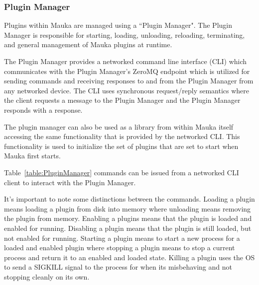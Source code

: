 \subsubsection{Plugin Manager}
Plugins within Mauka are managed using a ``Plugin Manager". The Plugin Manager is responsible for starting, loading, unloading, reloading, terminating, and general management of Mauka plugins at runtime.

The Plugin Manager provides a networked command line interface (CLI) which communicates with the Plugin Manager's ZeroMQ endpoint which is utilized for sending commands and receiving responses to and from the Plugin Manager from any networked device. The CLI uses synchronous request/reply semantics where the client requests a message to the Plugin Manager and the Plugin Manager responds with a response.

The plugin manager can also be used as a library from within Mauka itself accessing the same functionality that is provided by the networked CLI. This functionality is used to initialize the set of plugins that are set to start when Mauka first starts.

Table~\ref{table:PluginManager} commands can be issued from a networked CLI client to interact with the Plugin Manager.

It's important to note some distinctions between the commands. Loading a plugin means loading a plugin from disk into memory where unloading means removing the plugin from memory. Enabling a plugins means that the plugin is loaded and enabled for running. Disabling a plugin means that the plugin is still loaded, but not enabled for running. Starting a plugin means to start a new process for a loaded and enabled plugin where stopping a plugin means to stop a current process and return it to an enabled and loaded state. Killing a plugin uses the OS to send a SIGKILL signal to the process for when its misbehaving and not stopping cleanly on its own.

